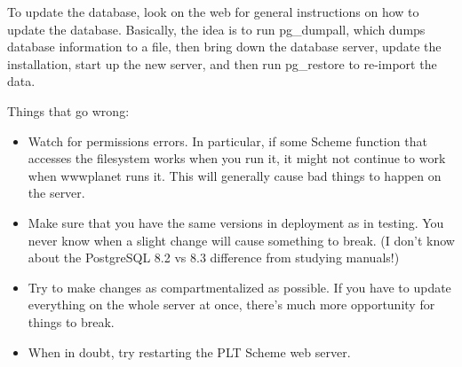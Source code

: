 \documentclass{article}
\begin{document}
To update the database, look on the web for general instructions on
how to update the database. Basically, the idea is to run pg\_dumpall,
which dumps database information to a file, then bring down the
database server, update the installation, start up the new server, and
then run pg\_restore to re-import the data.

Things that go wrong:

\begin{itemize}
\item Watch for permissions errors. In particular, if some Scheme function
  that accesses the filesystem works when you run it, it might not
  continue to work when wwwplanet runs it. This will generally cause
  bad things to happen on the server.

\item Make sure that you have the same versions in deployment as in
  testing. You never know when a slight change will cause something to
  break. (I don't know about the PostgreSQL 8.2 vs 8.3 difference from
  studying manuals!)

\item Try to make changes as compartmentalized as possible. If you have to
  update everything on the whole server at once, there's much more
  opportunity for things to break.

\item When in doubt, try restarting the PLT Scheme web server.
\end{itemize}
\end{document}
